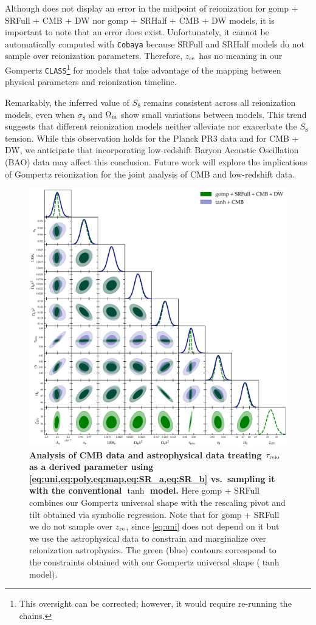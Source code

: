 Although  does not display an error in the midpoint
of reionization for gomp + SRFull + CMB + DW nor gomp + SRHalf + CMB +
DW models, it is important to note that an error does exist.
Unfortunately, it cannot be automatically computed with \texttt{Cobaya}
because SRFull and SRHalf models do not sample over reionization
parameters.
Therefore, $z_{\mathrm{re}}$ has no meaning in our Gompertz
\texttt{CLASS}\footnote{This oversight can be corrected; however, it
would require re-running the chains.} for models that take advantage of
the mapping between physical parameters and reionization timeline.

Remarkably, the inferred value of $S_8$ remains consistent across all
reionization models, even when $\sigma_8$ and $\Omega_\mathrm{m}$ show small
variations between models.
This trend suggests that different reionization models neither alleviate
nor exacerbate the $S_8$ tension.
While this observation holds for the Planck PR3 data and for CMB + DW,
we anticipate that incorporating low-redshift Baryon Acoustic
Oscillation (BAO) data may affect this conclusion.
Future work will explore the implications of Gompertz reionization for
the joint analysis of CMB and low-redshift data.


\begin{figure}
\centering
\includegraphics[width=\linewidth]{figs/gomp1dw_tanh_triangle_kill_full.pdf}
\caption{\textbf{Analysis of CMB data and astrophysical data treating
$\tau_{\mathrm{reio}}$ as a derived parameter using
\cref{eq:uni,eq:poly,eq:map,eq:SR_a,eq:SR_b} vs.\ sampling it with the
conventional $\tanh$ model.}
Here gomp + SRFull combines our Gompertz universal shape with the
rescaling pivot and tilt obtained via symbolic regression.
Note that for gomp + SRFull we do not sample over $z_{\mathrm{re}}$, since
\cref{eq:uni} does not depend on it but we use the astrophysical data to
constrain and marginalize over reionization astrophysics.
The green (blue) contours correspond to the constraints obtained with
our Gompertz universal shape ($\tanh$ model).}
\label{fig:unleashed_gomp}
\end{figure}

